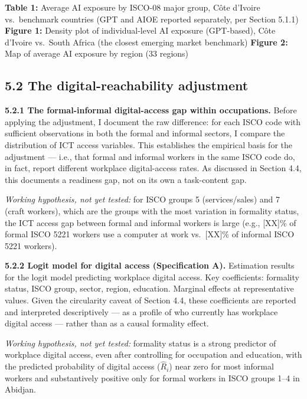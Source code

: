 \documentclass[
  11pt,
]{article}
\begin{document}
\textbf{Table 1:} Average AI exposure by ISCO-08 major group, Côte
d'Ivoire vs.~benchmark countries (GPT and AIOE reported separately, per
Section 5.1.1) \textbf{Figure 1:} Density plot of individual-level AI
exposure (GPT-based), Côte d'Ivoire vs.~South Africa (the closest
emerging market benchmark) \textbf{Figure 2:} Map of average AI exposure
by region (33 regions)

\subsection{5.2 The digital-reachability
adjustment}\label{the-digital-reachability-adjustment}

\textbf{5.2.1 The formal-informal digital-access gap within
occupations.} Before applying the adjustment, I document the raw
difference: for each ISCO code with sufficient observations in both the
formal and informal sectors, I compare the distribution of ICT access
variables. This establishes the empirical basis for the adjustment ---
i.e., that formal and informal workers in the same ISCO code do, in
fact, report different workplace digital-access rates. As discussed in
Section 4.4, this documents a readiness gap, not on its own a
task-content gap.

\emph{Working hypothesis, not yet tested:} for ISCO groups 5
(services/sales) and 7 (craft workers), which are the groups with the
most variation in formality status, the ICT access gap between formal
and informal workers is large (e.g., {[}XX{]}\% of formal ISCO 5221
workers use a computer at work vs.~{[}XX{]}\% of informal ISCO 5221
workers).

\textbf{5.2.2 Logit model for digital access (Specification A).}
Estimation results for the logit model predicting workplace digital
access. Key coefficients: formality status, ISCO group, sector, region,
education. Marginal effects at representative values. Given the
circularity caveat of Section 4.4, these coefficients are reported and
interpreted descriptively --- as a profile of who currently has
workplace digital access --- rather than as a causal formality effect.

\emph{Working hypothesis, not yet tested:} formality status is a strong
predictor of workplace digital access, even after controlling for
occupation and education, with the predicted probability of digital
access (\(\hat{R}_i\)) near zero for most informal workers and
substantively positive only for formal workers in ISCO groups 1--4 in
Abidjan.
\end{document}
